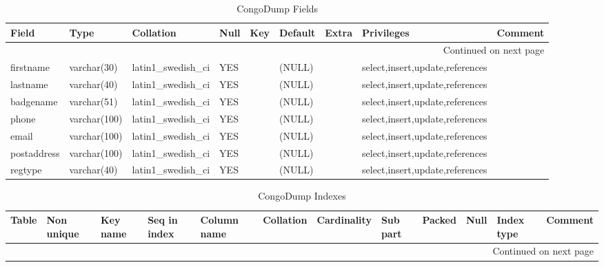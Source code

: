 \documentclass[tablesignature,landscape]{scrartcl}
\begin{document}
\begin{longtable}{|l|l|l|l|l|l|l|l|l|}
\caption{CongoDump Fields} \label{tbl:congodumpfields}\\
\hline
 Field        &  Type          &  Collation                &  Null  &  Key  &  Default  &  Extra  &  Privileges                       &  Comment \\
\hline
\endhead
\hline\multicolumn{9}{r}{Continued on next page}\
\endfoot
\endlastfoot
\hline
 badgeid      &  varchar(15)   &  latin1\_{}swedish\_{}ci  &        &  PRI  &           &         &  select,insert,update,references  &           \\
 firstname    &  varchar(30)   &  latin1\_{}swedish\_{}ci  &  YES   &       &  (NULL)   &         &  select,insert,update,references  &           \\
 lastname     &  varchar(40)   &  latin1\_{}swedish\_{}ci  &  YES   &       &  (NULL)   &         &  select,insert,update,references  &           \\
 badgename    &  varchar(51)   &  latin1\_{}swedish\_{}ci  &  YES   &       &  (NULL)   &         &  select,insert,update,references  &           \\
 phone        &  varchar(100)  &  latin1\_{}swedish\_{}ci  &  YES   &       &  (NULL)   &         &  select,insert,update,references  &           \\
 email        &  varchar(100)  &  latin1\_{}swedish\_{}ci  &  YES   &       &  (NULL)   &         &  select,insert,update,references  &           \\
 postaddress  &  varchar(100)  &  latin1\_{}swedish\_{}ci  &  YES   &       &  (NULL)   &         &  select,insert,update,references  &           \\
 regtype      &  varchar(40)   &  latin1\_{}swedish\_{}ci  &  YES   &       &  (NULL)   &         &  select,insert,update,references  &           \\
\hline
\end{longtable}


\begin{longtable}{|l|l|l|l|l|l|l|l|l|l|l|l|}
\caption{CongoDump Indexes} \label{tbl:congodumpindexes}\\
\hline
 Table      &  Non unique  &  Key name  &  Seq in index  &  Column name  &  Collation  &  Cardinality  &  Sub part  &  Packed  &  Null  &  Index type  &  Comment \\
\hline
\endhead
\hline\multicolumn{12}{r}{Continued on next page}\
\endfoot
\endlastfoot
\hline
 CongoDump  &           0  &  PRIMARY   &             1  &  badgeid      &  A          &            2  &  (NULL)    &  (NULL)  &        &  BTREE       &           \\
\hline
\end{longtable}
\end{document}
